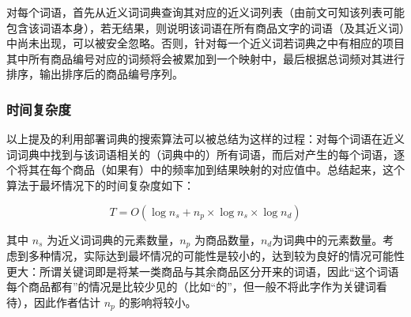 对每个词语，首先从近义词词典查询其对应的近义词列表（由前文可知该列表可能包含该词语本身），若无结果，则说明该词语在所有商品文字的词语（及其近义词）中尚未出现，可以被安全忽略。否则，针对每一个近义词若词典之中有相应的项目其中所有商品编号对应的词频将会被累加到一个映射中，最后根据总词频对其进行排序，输出排序后的商品编号序列。

\subsubsection{时间复杂度}

以上提及的利用部署词典的搜索算法可以被总结为这样的过程：对每个词语在近义词词典中找到与该词语相关的（词典中的）所有词语，而后对产生的每个词语，逐个将其在每个商品（如果有）中的频率加到结果映射的对应值中。总结起来，这个算法于最坏情况下的时间复杂度如下：

\begin{equation}
	T = O(\log n_s + n_p \times \log n_s \times \log n_d)
\end{equation}

其中 $n_s$ 为近义词词典的元素数量，$n_p$ 为商品数量，$n_d$为词典中的元素数量。考虑到多种情况，实际达到最坏情况的可能性是较小的，达到较为良好的情况可能性更大：所谓关键词即是将某一类商品与其余商品区分开来的词语，因此“这个词语每个商品都有”的情况是比较少见的（比如“的”，但一般不将此字作为关键词看待），因此作者估计 $n_p$ 的影响将较小。
